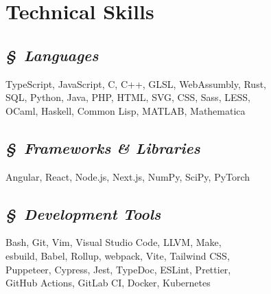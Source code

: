 \documentclass[11pt]{article}
\begin{document}
\begin{minipage}{280pt}
\section*{\sc Technical Skills}
\subsection*{\it\S\ Languages}
TypeScript, JavaScript, C, C++, GLSL, WebAssumbly, Rust,\\
SQL, Python, Java, PHP, HTML, SVG, CSS, Sass, LESS,\\
OCaml, Haskell, Common Lisp, MATLAB, Mathematica

\subsection*{\it\S\ Frameworks \& Libraries}
Angular, React, Node.js, Next.js, NumPy, SciPy, PyTorch

\subsection*{\it\S\ Development Tools}
Bash, Git, Vim, Visual Studio Code, LLVM, Make,\\
esbuild, Babel, Rollup, webpack, Vite, Tailwind CSS,\\
Puppeteer, Cypress, Jest, TypeDoc, ESLint, Prettier, \\
GitHub Actions, GitLab CI, Docker, Kubernetes

\end{minipage}
\end{document}
